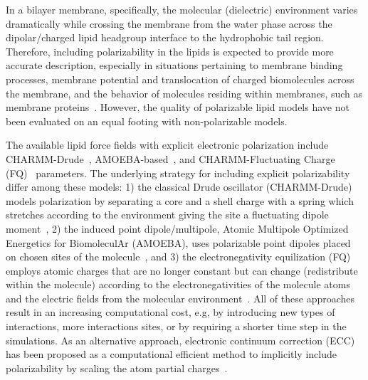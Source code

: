 \documentclass[journal=jctcce,manuscript=article,layout=singlecolumn]{achemso}
\begin{document}
In a bilayer membrane, specifically, the molecular (dielectric) environment varies dramatically while crossing the membrane from the water phase across the dipolar/charged lipid headgroup interface to the hydrophobic tail region. Therefore, including polarizability in the lipids is expected to provide more accurate description, especially in situations pertaining to membrane binding processes, membrane potential and translocation of charged biomolecules across the membrane, and the behavior of molecules residing within membranes, such as membrane proteins~\cite{baker2015polarizable,Lemkul2016, li2017drude,chu2018anionicpolarizable,Lynch21,Chen2021,Melcr:2018a, melcr2019improved,nencini22}. However, the quality of polarizable lipid models have not been evaluated on an equal footing with non-polarizable models.


The available lipid force fields with explicit electronic polarization include CHARMM-Drude~\cite{li2017drude, yu2023drude}, AMOEBA-based~\cite{chu2018anionicpolarizable,chu2018polarizable}, and CHARMM-Fluctuating Charge (FQ)~\cite{lucas2012charge} parameters. The underlying strategy for including explicit polarizability differ among these models:  1) the classical Drude oscillator (CHARMM-Drude) models polarization by separating a core and a shell charge with a spring which stretches according to the environment giving the site a fluctuating dipole moment~\cite{Lemkul2016},
2) the induced point dipole/multipole, Atomic Multipole Optimized Energetics for BiomoleculAr (AMOEBA), uses polarizable point dipoles placed on chosen sites of the molecule~\cite{ponder2010current},
and 3) the electronegativity equilization (FQ) employs atomic charges that are no longer constant but can change (redistribute within the molecule) according to the electronegativities of the molecule atoms and the electric fields from the molecular environment~\cite{patel2004charmm}. All of these approaches result in an increasing computational cost, e.g, by introducing new types of interactions, more interactions sites, or by requiring a shorter time step in the simulations. As an alternative approach, electronic continuum correction (ECC) has been proposed as a computational efficient method to implicitly include polarizability by scaling the atom partial charges~\cite{Melcr:2018a,dijon20}.
\end{document}

